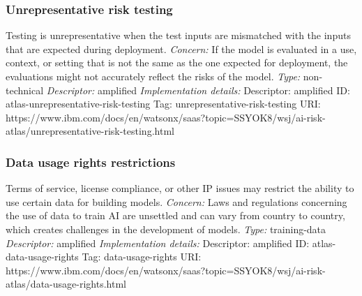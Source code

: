 \documentclass{article}
\begin{document}
\subsubsection*{Unrepresentative risk testing}
Testing is unrepresentative when the test inputs are mismatched with the inputs that are expected during deployment.\newline
\textit{Concern: }If the model is evaluated in a use, context, or setting that is not the same as the one expected for deployment, the evaluations might not accurately reflect the risks of the model.\newline\newline
\textit{Type: }non-technical\newline
\textit{Descriptor: }amplified \newline\newline
\textit{Implementation details:} \newline
Descriptor: amplified \newline
ID: atlas-unrepresentative-risk-testing \newline
Tag: unrepresentative-risk-testing \newline
URI:  https://www.ibm.com/docs/en/watsonx/saas?topic=SSYOK8/wsj/ai-risk-atlas/unrepresentative-risk-testing.html\newline
\subsubsection*{Data usage rights restrictions}
Terms of service, license compliance, or other IP issues may restrict the ability to use certain data for building models.\newline
\textit{Concern: }Laws and regulations concerning the use of data to train AI are unsettled and can vary from country to country, which creates challenges in the development of models.\newline\newline
\textit{Type: }training-data\newline
\textit{Descriptor: }amplified \newline\newline
\textit{Implementation details:} \newline
Descriptor: amplified \newline
ID: atlas-data-usage-rights \newline
Tag: data-usage-rights \newline
URI:  https://www.ibm.com/docs/en/watsonx/saas?topic=SSYOK8/wsj/ai-risk-atlas/data-usage-rights.html\newline
\end{document}
